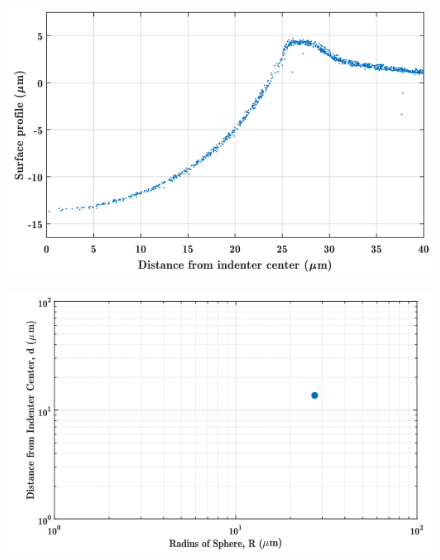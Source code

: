 \begin{figure}
	\centering
	\includegraphics[width=\linewidth]{Chapters/Figures/sphere011_ia/side_collapsed_zoomed}
	\caption[Collapsed Side Profile: Zoomed]{}
	\caption{}
	\label{fig:sidecollapsedzoomed}
\end{figure}
\begin{figure}
	\centering
	\includegraphics[width=\linewidth]{Chapters/Figures/sphere011_ia/single_d_vs_r}
	\caption[D vs R plot]{}
	\caption{}
	\label{fig:singledvsr}
\end{figure}
